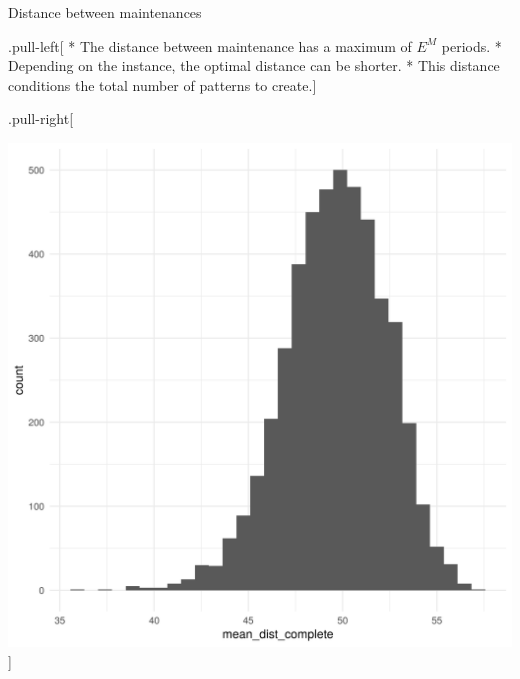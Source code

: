 \begin{frame}

\begin{block}{Distance between maintenances}

.pull-left{[} * The distance between maintenance has a maximum of
\(E^{M}\) periods. * Depending on the instance, the optimal distance can
be shorter. * This distance conditions the total number of patterns to
create.{]}

.pull-right{[}

\includegraphics[width=1\linewidth]{hist_mean_dist_complete_IT000125_20190716}
{]}

\end{block}

\end{frame}

